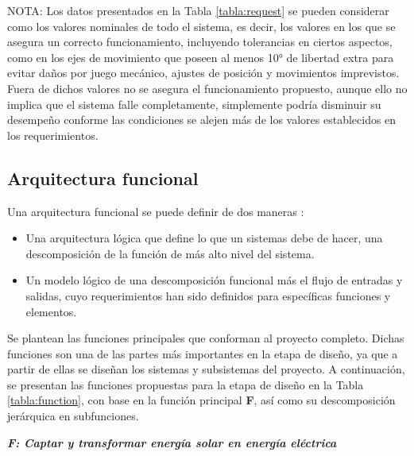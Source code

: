 \newpage
NOTA: Los datos presentados en la Tabla \ref{tabla:request} se pueden considerar como los valores nominales de todo el sistema, es decir, los valores en los que se asegura un correcto funcionamiento, incluyendo tolerancias en ciertos aspectos, como en los ejes de movimiento que poseen al menos 10° de libertad extra para evitar daños por juego mecánico, ajustes de posición y movimientos imprevistos. Fuera de dichos valores no se asegura el funcionamiento propuesto, aunque ello no implica que el sistema falle completamente, simplemente podría disminuir su desempeño conforme las condiciones se alejen más de los valores establecidos en los requerimientos.
%
\subsection{Arquitectura funcional}
Una arquitectura funcional se puede definir de dos maneras \cite{DC4}:

\begin{itemize}
	\item Una arquitectura lógica que define lo que un sistemas debe de hacer, una descomposición de la función de más alto nivel del sistema.
	\item Un modelo lógico de una descomposición funcional más el flujo de entradas y salidas, cuyo requerimientos han sido definidos para específicas funciones y elementos.
\end{itemize}

Se plantean las funciones principales que conforman al proyecto completo. Dichas funciones son una de las partes más importantes en la etapa de diseño, ya que a partir de ellas se diseñan los sistemas y subsistemas del proyecto. A continuación, se presentan las funciones propuestas para la etapa de diseño en la Tabla \ref{tabla:function}, con base en la función principal \textbf{F}, así como su descomposición jerárquica en subfunciones.

\begin{center}
	\textbf{\textit{F: Captar y transformar energía solar en energía eléctrica}}
\end{center}

